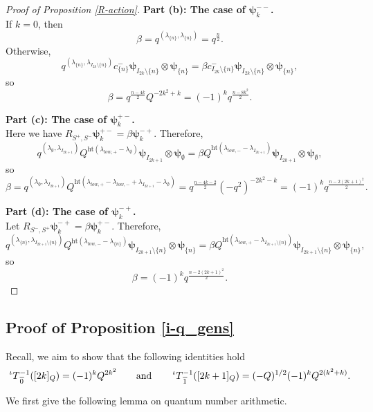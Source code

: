 \documentclass[10pt]{amsart}
\numberwithin{equation}{section}
\theoremstyle{definition}
\newcommand{\hgt}{\mathrm{ht}}
\newcommand{\iQW}{\prescript{\iota}{}{T}}
\newcommand{\hwp}{\boldsymbol{\psi}}
\begin{document}
\begin{proof}[Proof of Proposition \ref{R-action}]
\smallskip
\noindent\textbf{Part (b): The case of $\hwp_k^{--}$.}\\

If $k=0$, then
\[
    \beta = q^{(\lambda_{\{n\}},\lambda_{\{n\}})}=q^{\frac{n}{2}}.
\]
Otherwise, 
\[
    q^{(\lambda_{\{n\}},\lambda_{I_{2k}\setminus \{n\}})}c^-_{\{n\}}\hwp_{I_{2k}\setminus \{n\}}\otimes \hwp_{\{n\}} =\beta c^-_{I_{2k}\setminus \{n\}}\hwp_{I_{2k}\setminus \{n\}}\otimes \hwp_{\{n\}},
\]
so
\[
    \beta=q^{\frac{n-4k}{2}}Q^{-2k^2+k}=(-1)^kq^{\frac{n-8k^2}{2}}.
\]

\smallskip
\noindent\textbf{Part (c): The case of $\hwp_k^{+-}$.}\\

Here we have $R_{S^+,S^-}\hwp_{k}^{+-}=\beta \hwp_{k}^{-+}$. Therefore,
\[
    q^{(\lambda_{\emptyset},\lambda_{I_{2k+1}})}Q^{\hgt(\lambda_{low,+}-\lambda_{\emptyset})}\hwp_{I_{2k+1}}\otimes \hwp_{\emptyset}=\beta Q^{\hgt(\lambda_{low,-}-\lambda_{I_{2k+1}})}\hwp_{I_{2k+1}}\otimes \hwp_{\emptyset},
\]
so
\[
    \beta=q^{(\lambda_{\emptyset},\lambda_{I_{2k+1}})}Q^{\hgt(\lambda_{low,+}-\lambda_{low,-}+\lambda_{I_{2k+1}}-\lambda_{\emptyset})}=q^{\frac{n-4k-2}{2}}(-q^2)^{-2k^2-k}=(-1)^kq^{\frac{n-2(2k+1)^2}{2}}.
\]

\smallskip
\noindent\textbf{Part (d): The case of $\hwp_k^{-+}$.}\\

Let $R_{S^-,S^+}\hwp_{k}^{-+}=\beta \hwp_{k}^{+-}$. Therefore,
\[
    q^{(\lambda_{\{n\}},\lambda_{I_{2k+1}\setminus \{n\}})}Q^{\hgt(\lambda_{low,-}-\lambda_{\{n\}})}\hwp_{I_{2k+1}\setminus \{n\}}\otimes \hwp_{\{n\}}=\beta Q^{\hgt(\lambda_{low,+}-\lambda_{I_{2k+1}\setminus \{n\}})}\hwp_{I_{2k+1}\setminus \{n\}}\otimes \hwp_{\{n\}},
\]
so
\[
\beta=(-1)^kq^{\frac{n-2(2k+1)^2}{2}}.
\]
\end{proof}

\subsection{Proof of Proposition \ref{i-q_gens}}\label{proof6.2}

Recall, we aim to show that the following identities hold
\[
    \iQW^{-1}_{\overline{0}}([2k]_Q)=(-1)^k Q^{2k^2} \qquad \text{and} \qquad \iQW^{-1}_{\overline{1}}([2k+1]_Q)=(-Q)^{1/2} (-1)^kQ^{2(k^2+k)}.
\]

We first give the following lemma on quantum number arithmetic.
\end{document}

